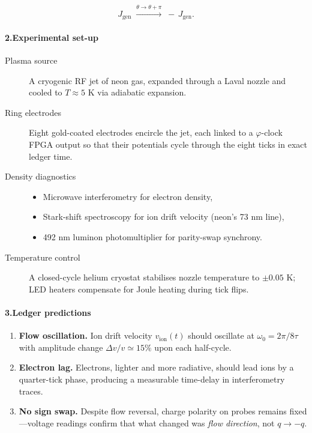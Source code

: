 \documentclass[11pt,oneside]{book}
\begin{document}
\[
  J_{\text{gen}}\;\overset{\theta\to\theta+\pi}{\longrightarrow}\;
  -\,J_{\text{gen}}.
\]

\paragraph*{2.\;Experimental set-up}

\begin{description}
\item[Plasma source] A cryogenic RF jet of neon gas, expanded through a Laval nozzle and cooled to $T\approx5$ K via adiabatic expansion.

\item[Ring electrodes] Eight gold-coated electrodes encircle the jet, each linked to a $\varphi$-clock FPGA output so that their potentials cycle through the eight ticks in exact ledger time.

\item[Density diagnostics]  
  \begin{itemize}
    \item Microwave interferometry for electron density,
    \item Stark-shift spectroscopy for ion drift velocity (neon’s 73 nm line),
    \item 492 nm luminon photomultiplier for parity-swap synchrony.
  \end{itemize}

\item[Temperature control] A closed-cycle helium cryostat stabilises nozzle temperature to $\pm0.05$ K; LED heaters compensate for Joule heating during tick flips.
\end{description}

\paragraph*{3.\;Ledger predictions}

\begin{enumerate}
\item \textbf{Flow oscillation.}  
  Ion drift velocity $v_{\text{ion}}(t)$ should oscillate at $\omega_{0} = 2\pi/8\tau$ with amplitude change $\Delta v/v \simeq 15\%$ upon each half-cycle.

\item \textbf{Electron lag.}  
  Electrons, lighter and more radiative, should lead ions by a quarter-tick phase, producing a measurable time-delay in interferometry traces.

\item \textbf{No sign swap.}  
  Despite flow reversal, charge polarity on probes remains fixed—voltage readings confirm that what changed was \emph{flow direction}, not $q\to -q$.
\end{enumerate}
\end{document}
